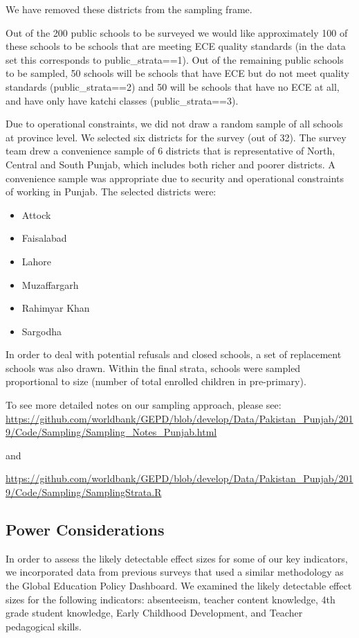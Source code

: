 \documentclass[]{article}
\providecommand{\tightlist}{%
  \setlength{\itemsep}{0pt}\setlength{\parskip}{0pt}}
\begin{document}
We have removed these districts from the sampling frame.

Out of the 200 public schools to be surveyed we would like approximately
100 of these schools to be schools that are meeting ECE quality
standards (in the data set this corresponds to public\_strata==1). Out
of the remaining public schools to be sampled, 50 schools will be
schools that have ECE but do not meet quality standards
(public\_strata==2) and 50 will be schools that have no ECE at all, and
have only have katchi classes (public\_strata==3).

Due to operational constraints, we did not draw a random sample of all
schools at province level. We selected six districts for the survey (out
of 32). The survey team drew a convenience sample of 6 districts that is
representative of North, Central and South Punjab, which includes both
richer and poorer districts. A convenience sample was appropriate due to
security and operational constraints of working in Punjab. The selected
districts were:

\begin{itemize}
\tightlist
\item
  Attock
\item
  Faisalabad
\item
  Lahore
\item
  Muzaffargarh
\item
  Rahimyar Khan
\item
  Sargodha
\end{itemize}

In order to deal with potential refusals and closed schools, a set of
replacement schools was also drawn. Within the final strata, schools
were sampled proportional to size (number of total enrolled children in
pre-primary).

To see more detailed notes on our sampling approach, please see:
\url{https://github.com/worldbank/GEPD/blob/develop/Data/Pakistan_Punjab/2019/Code/Sampling/Sampling_Notes_Punjab.html}

and

\url{https://github.com/worldbank/GEPD/blob/develop/Data/Pakistan_Punjab/2019/Code/Sampling/SamplingStrata.R}

\hypertarget{power-considerations}{%
\subsection{Power Considerations}\label{power-considerations}}

In order to assess the likely detectable effect sizes for some of our
key indicators, we incorporated data from previous surveys that used a
similar methodology as the Global Education Policy Dashboard. We
examined the likely detectable effect sizes for the following
indicators: absenteeism, teacher content knowledge, 4th grade student
knowledge, Early Childhood Development, and Teacher pedagogical skills.
\end{document}
